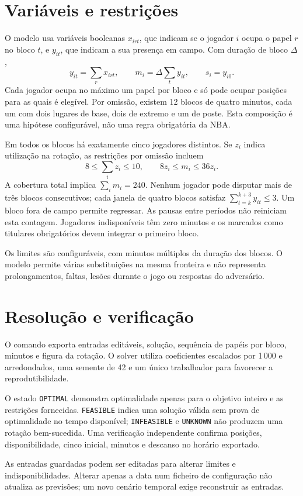 \section{Variáveis e restrições}

O modelo usa variáveis booleanas \(x_{irt}\), que indicam se o jogador
\(i\) ocupa o papel \(r\) no bloco \(t\), e \(y_{it}\), que indicam a sua
presença em campo. Com duração de bloco \(\Delta\),
\[
y_{it}=\sum_r x_{irt},\qquad m_i=\Delta\sum_t y_{it},
\qquad s_i=y_{i0}.
\]
Cada jogador ocupa no máximo um papel por bloco e só pode ocupar posições
para as quais é elegível. Por omissão, existem 12 blocos de quatro minutos,
cada um com dois lugares de base, dois de extremo e um de poste.
Esta composição é uma hipótese configurável, não uma regra obrigatória da NBA.

Em todos os blocos há exatamente cinco jogadores distintos. Se \(z_i\)
indica utilização na rotação, as restrições por omissão incluem
\[
8\leq\sum_i z_i\leq10,\qquad
8z_i\leq m_i\leq36z_i.
\]
A cobertura total implica \(\sum_i m_i=240\). Nenhum jogador pode disputar mais de três blocos consecutivos; cada janela
de quatro blocos satisfaz \(\sum_{t=k}^{k+3}y_{it}\leq3\).
Um bloco fora de campo permite regressar. As pausas entre períodos não
reiniciam esta contagem. Jogadores indisponíveis têm zero minutos e os
marcados como titulares obrigatórios devem integrar o primeiro bloco.

Os limites são configuráveis, com minutos múltiplos da duração dos blocos.
O modelo permite várias substituições na mesma fronteira e não representa
prolongamentos, faltas, lesões durante o jogo ou respostas do adversário.

\section{Resolução e verificação}

O comando  exporta entradas editáveis,
solução, sequência de papéis por bloco, minutos e figura da rotação.
O solver utiliza coeficientes escalados por 1\,000 e arredondados, uma
semente de 42 e um único trabalhador para favorecer a reprodutibilidade.

O estado \texttt{OPTIMAL} demonstra optimalidade apenas para o objetivo
inteiro e as restrições fornecidas. \texttt{FEASIBLE} indica uma solução
válida sem prova de optimalidade no tempo disponível; \texttt{INFEASIBLE}
e \texttt{UNKNOWN} não produzem uma rotação bem-sucedida.
Uma verificação independente confirma posições, disponibilidade, cinco
inicial, minutos e descanso no horário exportado.

As entradas guardadas podem ser editadas para alterar limites e
indisponibilidades. Alterar apenas a data num ficheiro de configuração não
atualiza as previsões; um novo cenário temporal exige reconstruir as entradas.

